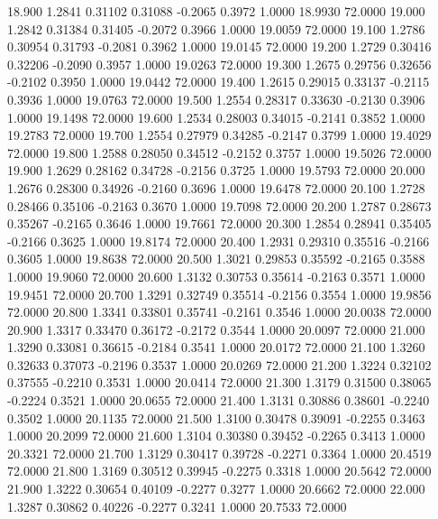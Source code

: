   18.900   1.2841   0.31102   0.31088  -0.2065   0.3972   1.0000  18.9930  72.0000
  19.000   1.2842   0.31384   0.31405  -0.2072   0.3966   1.0000  19.0059  72.0000
  19.100   1.2786   0.30954   0.31793  -0.2081   0.3962   1.0000  19.0145  72.0000
  19.200   1.2729   0.30416   0.32206  -0.2090   0.3957   1.0000  19.0263  72.0000
  19.300   1.2675   0.29756   0.32656  -0.2102   0.3950   1.0000  19.0442  72.0000
  19.400   1.2615   0.29015   0.33137  -0.2115   0.3936   1.0000  19.0763  72.0000
  19.500   1.2554   0.28317   0.33630  -0.2130   0.3906   1.0000  19.1498  72.0000
  19.600   1.2534   0.28003   0.34015  -0.2141   0.3852   1.0000  19.2783  72.0000
  19.700   1.2554   0.27979   0.34285  -0.2147   0.3799   1.0000  19.4029  72.0000
  19.800   1.2588   0.28050   0.34512  -0.2152   0.3757   1.0000  19.5026  72.0000
  19.900   1.2629   0.28162   0.34728  -0.2156   0.3725   1.0000  19.5793  72.0000
  20.000   1.2676   0.28300   0.34926  -0.2160   0.3696   1.0000  19.6478  72.0000
  20.100   1.2728   0.28466   0.35106  -0.2163   0.3670   1.0000  19.7098  72.0000
  20.200   1.2787   0.28673   0.35267  -0.2165   0.3646   1.0000  19.7661  72.0000
  20.300   1.2854   0.28941   0.35405  -0.2166   0.3625   1.0000  19.8174  72.0000
  20.400   1.2931   0.29310   0.35516  -0.2166   0.3605   1.0000  19.8638  72.0000
  20.500   1.3021   0.29853   0.35592  -0.2165   0.3588   1.0000  19.9060  72.0000
  20.600   1.3132   0.30753   0.35614  -0.2163   0.3571   1.0000  19.9451  72.0000
  20.700   1.3291   0.32749   0.35514  -0.2156   0.3554   1.0000  19.9856  72.0000
  20.800   1.3341   0.33801   0.35741  -0.2161   0.3546   1.0000  20.0038  72.0000
  20.900   1.3317   0.33470   0.36172  -0.2172   0.3544   1.0000  20.0097  72.0000
  21.000   1.3290   0.33081   0.36615  -0.2184   0.3541   1.0000  20.0172  72.0000
  21.100   1.3260   0.32633   0.37073  -0.2196   0.3537   1.0000  20.0269  72.0000
  21.200   1.3224   0.32102   0.37555  -0.2210   0.3531   1.0000  20.0414  72.0000
  21.300   1.3179   0.31500   0.38065  -0.2224   0.3521   1.0000  20.0655  72.0000
  21.400   1.3131   0.30886   0.38601  -0.2240   0.3502   1.0000  20.1135  72.0000
  21.500   1.3100   0.30478   0.39091  -0.2255   0.3463   1.0000  20.2099  72.0000
  21.600   1.3104   0.30380   0.39452  -0.2265   0.3413   1.0000  20.3321  72.0000
  21.700   1.3129   0.30417   0.39728  -0.2271   0.3364   1.0000  20.4519  72.0000
  21.800   1.3169   0.30512   0.39945  -0.2275   0.3318   1.0000  20.5642  72.0000
  21.900   1.3222   0.30654   0.40109  -0.2277   0.3277   1.0000  20.6662  72.0000
  22.000   1.3287   0.30862   0.40226  -0.2277   0.3241   1.0000  20.7533  72.0000
